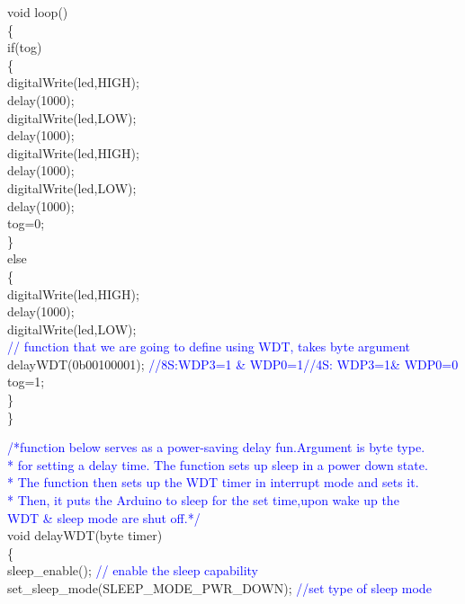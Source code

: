 \documentclass[12pt,a4paper]{article}
\begin{document}
void loop()\\
  \{\\
    if(tog)\\
        \{ \\
          digitalWrite(led,HIGH);\\
          delay(1000);\\
          digitalWrite(led,LOW);\\
          delay(1000);\\
          digitalWrite(led,HIGH);\\
          delay(1000);\\
          digitalWrite(led,LOW);\\
          delay(1000);\\
          tog=0;\\
        \}\\
     else\\
        \{\\
          digitalWrite(led,HIGH);\\
          delay(1000);\\
          digitalWrite(led,LOW);\\
          \textcolor{blue}{// function that we are going to define using WDT, takes byte argument}\\
          delayWDT(0b00100001); \textcolor{blue}{//8S:WDP3=1 & WDP0=1//4S: WDP3=1& WDP0=0}\\
          tog=1;\\
          \} \\
    \}
    \vspace{30mm}

\textcolor{blue}{/*function below serves as a power-saving delay fun.Argument is byte type.\\
 * for setting a delay time. The function sets up sleep in a power down state.\\
 * The function then sets up the WDT timer in interrupt mode and sets it.\\
 * Then, it puts the Arduino to sleep for the set time,upon wake up the \\WDT & sleep mode are shut off.*/}\\[9pt]
void delayWDT(byte timer)\\
 \{\\
  sleep\_enable(); \textcolor{blue}{// enable the sleep capability}\\
  set\_sleep\_mode(SLEEP\_MODE\_PWR\_DOWN); \textcolor{blue}{//set type of sleep mode}\\
  
\end{document}
